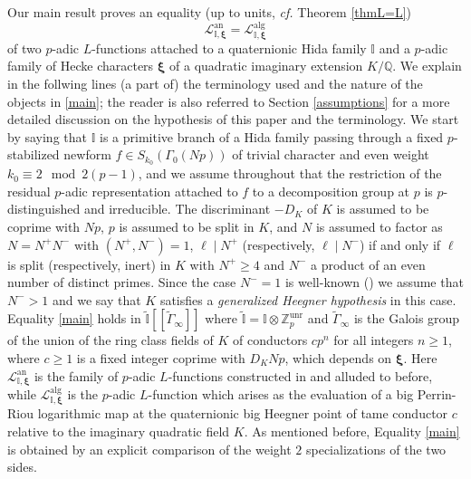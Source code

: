 \documentclass[a4paper,11pt]{amsart}
\numberwithin{equation}{section}
\theoremstyle{plain}
\theoremstyle{definition}
\theoremstyle{remark}
\newcommand{\Q}{\mathbb Q}
\newcommand{\Z}{\mathbb Z}
\newcommand{\I}{\mathbb{I}}
\newcommand{\unr}{\mathrm{unr}}
\begin{document}
Our main result proves an equality (up to units, \emph{cf.} Theorem \ref{thmL=L}) 
\begin{equation}\label{main}
\mathscr{L}_{\I,\boldsymbol{\xi}}^\mathrm{an}=\mathscr{L}_{\I,\boldsymbol{\xi}}^\mathrm{alg}\end{equation} of two $p$-adic $L$-functions attached to a quaternionic Hida family $\I$ and a $p$-adic family of Hecke characters $\boldsymbol{\xi}$ of a quadratic imaginary extension $K/\Q$.
We explain in the follwing lines (a part of) the terminology used and the 
nature of the objects in \eqref{main}; the reader is also referred to Section \ref{assumptions} for a more detailed discussion on the hypothesis of this paper and the terminology.
We start by saying that $\mathbb{I}$ is a primitive branch of a Hida family passing through a fixed $p$-stabilized newform $f\in S_{k_0}(\Gamma_0(Np))$ of trivial character and even weight $k_0\equiv 2\mod{2(p-1)}$, and we assume throughout that the 
restriction of the residual $p$-adic representation attached to $f$ to a decomposition group at $p$ is  $p$-distinguished and irreducible. The discriminant $-D_K$ of $K$ is assumed to be coprime with $Np$, $p$ is assumed to be split in $K$, and $N$ is assumed to factor as $N=N^+N^-$ with $(N^+,N^-)=1$, $\ell\mid N^+$ (respectively, $\ell\mid N^-$) if and only if $\ell$ is split (respectively, inert) in $K$ with $N^+\geq 4$ and $N^-$ a product of an even number of distinct primes. Since the case $N^-=1$ is well-known (\cite{Castella, Castella-MathAnn}) 
we assume that $N^->1$ and we say that $K$ satisfies a \emph{generalized Heegner hypothesis} in this case. 
Equality \eqref{main} holds in 
$\widetilde{\I}[[\widetilde{\Gamma}_\infty]]$ where $\widetilde{\I}=\I\otimes\Z_p^\unr$ and 
$\widetilde{\Gamma}_\infty$ is the Galois group of the union of the ring class fields of $K$ of conductors $cp^n$ for all integers $n\geq 1$, where $c\geq 1$ is a fixed integer coprime with $D_KNp$, 
which depends on $\boldsymbol{\xi}$. 
Here $\mathscr{L}_{\I,\boldsymbol{\xi}}^\mathrm{an}$ is the family of $p$-adic $L$-functions constructed in \cite{LMW} and alluded to before, while $\mathscr{L}_{\I,\boldsymbol{\xi}}^\mathrm{alg}$ is the $p$-adic $L$-function which arises as the evaluation of a big Perrin-Riou logarithmic map at the quaternionic big Heegner point of tame conductor $c$ relative to the imaginary quadratic field $K$.
As mentioned before, Equality \eqref{main} is obtained by an explicit comparison of the weight $2$ specializations of the two sides. 
\end{document}
